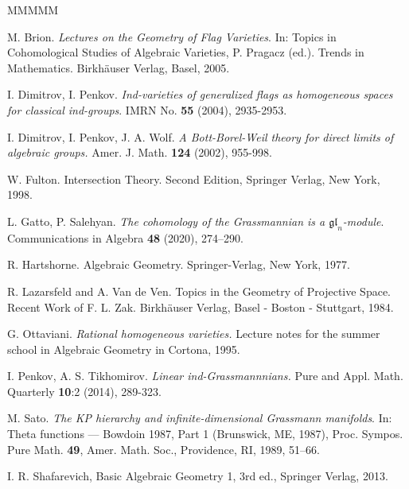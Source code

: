 \documentclass[12pt]{amsart}
\theoremstyle{definition}
\begin{document}
\begin{thebibliography}{MMMMM}

M. Brion. {\it Lectures on the Geometry of Flag Varieties}. In: 
Topics in Cohomological Studies of Algebraic 
Varieties, P. Pragacz (ed.). Trends in Mathematics. Birkh\"auser Verlag, Basel, 
2005. 


 I. Dimitrov, I. Penkov. {\it Ind-varieties of 
generalized flags as homogeneous spaces for classical 
ind-groups}. IMRN  No. {\bf 55} (2004), 2935-2953.

 I. Dimitrov, I. Penkov, J. A. Wolf. {\it A 
Bott-Borel-Weil theory for direct limits of algebraic groups.} 
Amer. J. Math. {\bf 124} (2002), 955-998.

 W. Fulton. Intersection Theory. Second Edition, 
Springer Verlag, New York, 1998.

L. Gatto, P. Salehyan. {\it The cohomology of the Grassmannian is 
a $\mathfrak{gl}_n$-module}. Communications in Algebra {\bf48} (2020), 274–290.

 R. Hartshorne. Algebraic Geometry. 
Springer-Verlag, New York, 1977.

 R. Lazarsfeld and A. Van de Ven.
Topics in the Geometry of Projective Space. Recent Work of 
F. L. Zak. Birkh\"auser Verlag, Basel - Boston - Stuttgart, 
1984. 

G. Ottaviani. {\it Rational homogeneous varieties.} Lecture notes 
for the summer school in Algebraic Geometry in Cortona, 1995.

I. Penkov, A. S. Tikhomirov. {\it Linear ind-Grassmannnians.} 
Pure and Appl. Math. Quarterly {\bf10}:2 (2014), 289-323.

M. Sato. {\it The KP hierarchy and infinite-dimensional Grassmann 
manifolds}. In: Theta functions — Bowdoin 1987, Part 1 (Brunswick, ME, 
1987), Proc. Sympos. Pure Math. {\bf49}, Amer. Math. Soc., Providence, 
RI, 1989, 51–66.

I. R. Shafarevich, Basic Algebraic Geometry 1, 3rd ed., Springer 
Verlag, 2013.


\vspace{1cm}



\end{thebibliography}
\end{document}
